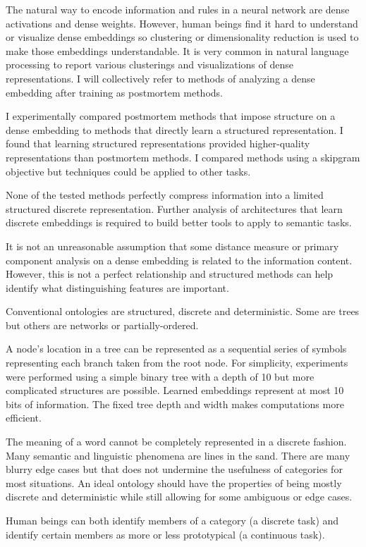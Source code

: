 \documentclass[sigconf]{acmart}
\begin{document}
The natural way to encode information and rules in a neural network are dense activations and dense weights. However, human beings find it hard to understand or visualize dense embeddings so clustering or dimensionality reduction is used to make those embeddings understandable. It is very common in natural language processing to report various clusterings and visualizations of dense representations. I will collectively refer to methods of analyzing a dense embedding after training as postmortem methods.

I experimentally compared postmortem methods that impose structure on a dense embedding to methods that directly learn a structured representation. I found that learning structured representations provided higher-quality representations than postmortem methods. I compared methods using a skipgram objective but techniques could be applied to other tasks.

None of the tested methods perfectly compress information into a limited structured discrete representation. Further analysis of architectures that learn discrete embeddings is required to build better tools to apply to semantic tasks.

It is not an unreasonable assumption that some distance measure or primary component analysis on a dense embedding is related to the information content. However, this is not a perfect relationship and structured methods can help identify what distinguishing features are important.

Conventional ontologies are  structured, discrete and deterministic. Some are trees but others are networks or partially-ordered.

A node's location in a tree can be represented as a sequential series of symbols representing each branch taken from the root node. For simplicity, experiments were performed using a simple binary tree with a depth of 10 but more complicated structures are possible. Learned embeddings represent at most 10 bits of information. The fixed tree depth and width makes computations more efficient.

The meaning of a word cannot be completely represented in a discrete fashion. Many semantic and linguistic phenomena are lines in the sand. There are many blurry edge cases but that does not undermine the usefulness of categories for most situations. An ideal ontology should have the properties of being mostly discrete and deterministic while still allowing for some ambiguous or edge cases.

Human beings can both identify members of a category (a discrete task) and identify certain members as more or less prototypical (a continuous task).
\end{document}
